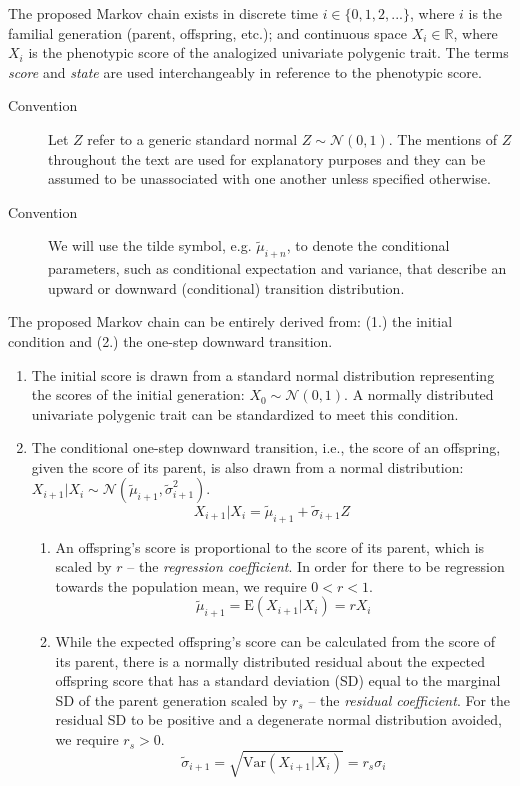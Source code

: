 \documentclass[letterpaper,10pt]{article} %
\begin{document}

The proposed Markov chain exists in discrete time $ i \in \{0, 1, 2,...\}$, where $i$ is the familial generation (parent, offspring, etc.); and continuous space $X_i \in \mathbb{R}$, where $X_i$ is the phenotypic score of the analogized univariate polygenic trait. The terms \emph{score} and \emph{state} are used interchangeably in reference to the phenotypic score. 

\begin{description}
\item [Convention] Let $Z$ refer to a generic standard normal $Z \sim \mathcal{N}(0, 1)$. The mentions of $Z$ throughout the text are used for explanatory purposes and they can be assumed to be unassociated with one another unless specified otherwise.
\item [Convention] We will use the tilde symbol, e.g. $\tilde{\mu}_{i+n}$, to denote the conditional parameters, such as conditional expectation and variance, that describe an upward or downward (conditional) transition distribution.
\end{description}

The proposed Markov chain can be entirely derived from: (1.) the initial condition and (2.) the one-step downward transition. 

\begin{enumerate}
\item The initial score is drawn from a standard normal distribution representing the scores of the initial generation: $X_0 \sim \mathcal{N}(0, 1)$. A normally distributed univariate polygenic trait can be standardized to meet this condition. 

\item The conditional one-step downward transition, i.e., the score of an offspring, given the score of its parent, is also drawn from a normal distribution: $X_{i+1}|X_i \sim \mathcal{N}(\tilde{\mu}_{i+1}, \tilde{\sigma}_{i+1}^2)$.
$$X_{i+1}|X_i = \tilde{\mu}_{i+1} + \tilde{\sigma}_{i+1} Z$$ 

\begin{enumerate}
\item An offspring's score is proportional to the score of its parent, which is scaled by $r$ -- the \emph{regression coefficient}. In order for there to be regression towards the population mean, we require $0 < r < 1$. 
$$\tilde{\mu}_{i+1} = \mathrm{E}(X_{i+1}|X_i) = rX_i$$

\item While the expected offspring's score can be calculated from the score of its parent, there is a normally distributed residual about the expected offspring score that has a standard deviation (SD) equal to the marginal SD of the parent generation scaled by $r_s$ -- the \emph{residual coefficient}. For the residual SD to be positive and a degenerate normal distribution avoided, we require $r_s > 0$.
$$\tilde{\sigma}_{i+1} = \sqrt{\mathrm{Var}(X_{i+1}|X_i)} = r_s \sigma_i$$
\end{enumerate}
\end{enumerate}
\end{document}
